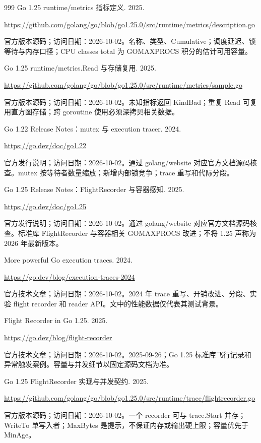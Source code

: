 \documentclass[UTF8,fontset=fandol,openany,11pt]{ctexbook}
\begin{document}
\begin{thebibliography}{999}
 Go 1.25 runtime/metrics 指标定义. 2025.\par
\url{https://github.com/golang/go/blob/go1.25.0/src/runtime/metrics/description.go}\par
{\small 官方版本源码；访问日期：2026-10-02。名称、类型、Cumulative；调度延迟、锁等待与内存口径；CPU classes total 为 GOMAXPROCS 积分的估计可用容量。}

 Go 1.25 runtime/metrics.Read 与存储复用. 2025.\par
\url{https://github.com/golang/go/blob/go1.25.0/src/runtime/metrics/sample.go}\par
{\small 官方版本源码；访问日期：2026-10-02。未知指标返回 KindBad；重复 Read 可复用直方图存储；跨 goroutine 使用必须深拷贝相关数据。}

 Go 1.22 Release Notes：mutex 与 execution tracer. 2024.\par
\url{https://go.dev/doc/go1.22}\par
{\small 官方发行说明；访问日期：2026-10-02。通过 golang/\allowbreak{}website 对应官方文档源码核查。mutex 按等待者数量缩放；新增内部锁竞争；trace 重写和代际分段。}

 Go 1.25 Release Notes：FlightRecorder 与容器感知. 2025.\par
\url{https://go.dev/doc/go1.25}\par
{\small 官方发行说明；访问日期：2026-10-02。通过 golang/\allowbreak{}website 对应官方文档源码核查。标准库 FlightReco\allowbreak{}rder 与容器相关 GOMAXPROCS 改进；不将 1.\allowbreak{}25 声称为 2026 年最新版本。}

 More powerful Go execution traces. 2024.\par
\url{https://go.dev/blog/execution-traces-2024}\par
{\small 官方技术文章；访问日期：2026-10-02。2024 年 trace 重写、开销改进、分段、实验 flight recorder 和 reader API。文中的性能数据仅代表其测试背景。}

 Flight Recorder in Go 1.25. 2025.\par
\url{https://go.dev/blog/flight-recorder}\par
{\small 官方技术文章；访问日期：2026-10-02。2025-\allowbreak{}09-\allowbreak{}26；Go 1.\allowbreak{}25 标准库飞行记录和异常触发案例。容量与并发细节以固定源码文档为准。}

 Go 1.25 FlightRecorder 实现与并发契约. 2025.\par
\url{https://github.com/golang/go/blob/go1.25.0/src/runtime/trace/flightrecorder.go}\par
{\small 官方版本源码；访问日期：2026-10-02。一个 recorder 可与 trace.\allowbreak{}Start 并存；WriteTo 单写入者；MaxBytes 是提示，不保证内存或输出硬上限；容量优先于 MinAge。}


\end{thebibliography}
\end{document}
